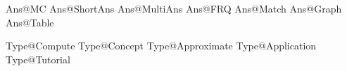 





Ans@MC			%
Ans@ShortAns	%
Ans@MultiAns	%
Ans@FRQ			%
Ans@Match		%
Ans@Graph		%
Ans@Table		%






Type@Compute			%
Type@Concept			%
Type@Approximate		%
Type@Application		%
Type@Tutorial			%





